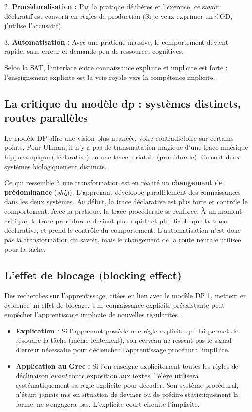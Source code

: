 2. \textbf{Procéduralisation :} Par la pratique délibérée et l'exercice, ce savoir déclaratif est
converti en règles de production (\og Si je veux exprimer un COD, j'utilise l'accusatif\fg{}).

3. \textbf{Automatisation :} Avec une pratique massive, le comportement devient rapide, sans erreur
et demande peu de ressources cognitives.

Selon la SAT, l'interface entre connaissance explicite et implicite est \og forte\fg{} :
l'enseignement explicite est la voie royale vers la compétence implicite.



\subsection{La critique du modèle dp : systèmes distincts, routes parallèles}

Le modèle DP offre une vision plus nuancée, voire contradictoire sur certains points. Pour Ullman,
il n'y a pas de transmutation magique d'une trace mnésique hippocampique (déclarative) en une trace
striatale (procédurale). Ce sont deux systèmes biologiquement distincts.

Ce qui ressemble à une \og transformation\fg{} est en réalité un \textbf{changement de prédominance}
(\textit{shift}). L'apprenant développe parallèlement des connaissances dans les deux systèmes. Au
début, la trace déclarative est plus forte et contrôle le comportement. Avec la pratique, la trace
procédurale se renforce. À un moment critique, la trace procédurale devient plus rapide et plus
fiable que la trace déclarative, et prend le contrôle du comportement. L'automatisation n'est donc
pas la transformation du savoir, mais le changement de la route neurale utilisée pour la tâche.



\subsection{L'effet de blocage (blocking effect)}

Des recherches sur l'apprentissage, citées en lien avec le modèle DP 1, mettent en évidence un \og
effet de blocage\fg{}. Une connaissance explicite préexistante peut empêcher l'apprentissage
implicite de nouvelles régularités.

\begin{itemize}\item \textbf{Explication :} Si l'apprenant possède une règle explicite qui lui permet de résoudre la tâche (même lentement), son cerveau ne ressent pas le \og signal d'erreur\fg{} nécessaire pour déclencher l'apprentissage procédural implicite.\item \textbf{Application au Grec :} Si l'on enseigne explicitement toutes les règles de déclinaison \textit{avant} toute exposition aux textes, l'élève utilisera systématiquement sa règle explicite pour décoder. Son système procédural, n'étant jamais mis en situation de \og deviner\fg{} ou de prédire statistiquement la forme, ne s'engagera pas. L'explicite \og court-circuite\fg{} l'implicite.\end{itemize}

